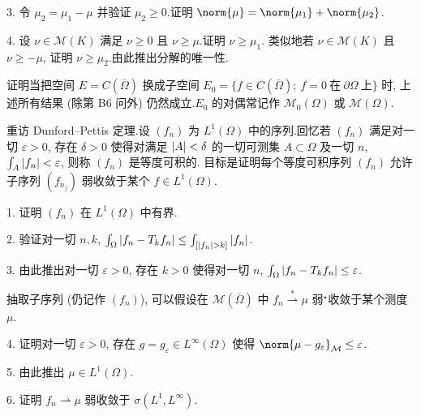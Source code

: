\begin{problem}[第 1, 3, 4 章]
3. 令 $\mu_2=\mu_1-\mu$ 并验证 $\mu_2\ge0$.证明 $\norm{\mu}=\norm{\mu_1}+\norm{\mu_2}$.

4. 设 $\nu\in\mathcal{M}(K)$ 满足 $\nu\ge0$ 且 $\nu\ge\mu$.证明 $\nu\ge\mu_1$.
类似地若 $\nu\in\mathcal{M}(K)$ 且 $\nu\ge-\mu$, 证明 $\nu\ge\mu_2$.由此推出分解的唯一性.


证明当把空间 $E=C(\overline\Omega)$ 换成子空间
$E_0=\{f\in C(\overline\Omega);\ f=0\ \text{在}\ \partial\Omega\ \text{上}\}$ 时,
上述所有结果 (除第 B6 问外) 仍然成立.$E_0$ 的对偶常记作 $\mathcal{M}_0(\Omega)$
或 $\mathcal{M}(\Omega)$.


重访 Dunford--Pettis 定理.设 $(f_n)$ 为 $L^1(\Omega)$ 中的序列.回忆若 $(f_n)$
满足对一切 $\varepsilon>0$, 存在 $\delta>0$ 使得对满足 $\left|A\right|<\delta$ 的一切可测集
$A\subset\Omega$ 及一切 $n$, $\int_A\left|f_n\right|<\varepsilon$, 则称 $(f_n)$ 是等度可积的.
目标是证明每个等度可积序列 $(f_n)$ 允许子序列 $(f_{n_j})$ 弱收敛于某个 $f\in L^1(\Omega)$.

1. 证明 $(f_n)$ 在 $L^1(\Omega)$ 中有界.

2. 验证对一切 $n,k$, $\int_\Omega\abs{f_n-T_kf_n}\le\int_{[\abs{f_n}>k]}\abs{f_n}$.

3. 由此推出对一切 $\varepsilon>0$, 存在 $k>0$ 使得对一切 $n$, $\int_\Omega\left|f_n-T_kf_n\right|\le\varepsilon$.

抽取子序列 (仍记作 $(f_n)$), 可以假设在 $\mathcal{M}(\overline\Omega)$ 中
$f_n\overset{*}{\rightharpoonup}\mu$ 弱$^\star$收敛于某个测度 $\mu$.

4. 证明对一切 $\varepsilon>0$, 存在 $g=g_\varepsilon\in L^\infty(\Omega)$ 使得
$\norm{\mu-g_\varepsilon}_{\mathcal{M}}\le\varepsilon$.

5. 由此推出 $\mu\in L^1(\Omega)$.

6. 证明 $f_n\rightharpoonup\mu$ 弱收敛于 $\sigma(L^1,L^\infty)$.
\end{problem}

